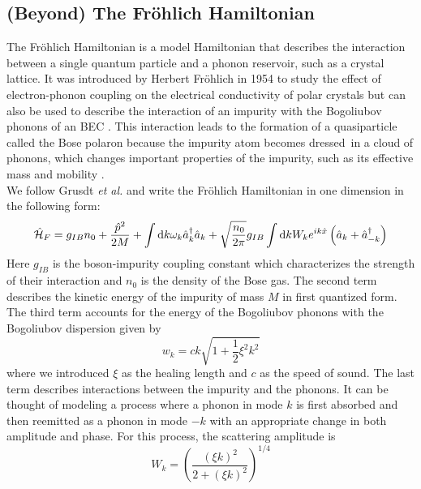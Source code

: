 \subsection{(Beyond) The Fröhlich Hamiltonian}\label{(Beyond) The Fröhlich Hamiltonian}
The Fröhlich Hamiltonian is a model Hamiltonian that describes the interaction between a single quantum particle and a phonon reservoir, such as a crystal lattice.%
It was introduced by Herbert Fröhlich in 1954 to study the effect of electron-phonon coupling on the electrical conductivity of polar crystals \cite{doi:10.1080/00018735400101213} but can also be used to describe the interaction of an impurity with the Bogoliubov phonons of an BEC \cite{Myśliwy2020}.%
This interaction leads to the formation of a quasiparticle called the Bose polaron because the impurity atom becomes \grqq dressed\grqq\ in a cloud of phonons, which changes important properties of the impurity, such as its effective mass and mobility \cite{Grusdt_2017}.\\ 
We follow Grusdt \emph{et al.} \cite{Grusdt_2017} and write the Fröhlich Hamiltonian in one dimension in the following form:
\begin{equation}\label{Fröhlich}
\hat{\mathcal{H}}_F = g_{IB}n_0+\frac{\hat p^2}{2M}+\int\mathrm d k\omega_{ k}\hat a^\dagger_{ k}\hat a_{ k}+\sqrt{\frac{n_0}{2\pi}}g_{IB}\int\mathrm d k W_k e^{ik\hat x}\left(\hat a_{ k}+\hat a^\dagger_{- k}\right)
\end{equation}
Here $g_{IB}$ is the boson-impurity coupling constant which characterizes the strength of their interaction and $n_0$ is the density of the Bose gas. The second term describes the kinetic energy of the impurity of mass $M$ in first quantized form. The third term accounts for the energy of the Bogoliubov phonons with the Bogoliubov dispersion given by 
\begin{equation}\label{bog_disp}
w_k=ck\sqrt{1+\frac12\xi^2k^2}
\end{equation}
where we introduced $\xi$ as the healing length %
and $c$ as the speed of sound. %
The last term describes interactions between the impurity and the phonons. It can be thought of modeling a process where a phonon in mode $k$ is first absorbed and then reemitted as a phonon in mode $-k$ with an appropriate change in both amplitude and phase. For this process, the scattering amplitude is
\begin{equation}\label{W_k_def}
W_k = \left(\frac{(\xi k)^2}{2+(\xi k)^2}\right)^{1/4}
\end{equation}
